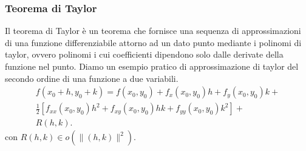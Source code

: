 \documentclass[a4paper, 12pt]{article}
\begin{document}
\subsubsection{Teorema di Taylor}
Il teorema di Taylor è un teorema che fornisce una sequenza di approssimazioni di una funzione differenziabile attorno ad un dato punto mediante i polinomi di taylor, ovvero polinomi i cui coefficienti dipendono solo dalle derivate della funzione nel punto.
Diamo un esempio pratico di approssimazione di taylor del secondo ordine di una funzione a due variabili.\\
\begin{equation*}\begin{gathered}
f(x_0+h, y_0+k) = f(x_0, y_0) + f_x(x_0, y_0)h + f_y(x_0, y_0)k + \\ \frac{1}{2}[f_{xx}(x_0, y_0)h^2 + f_{xy}(x_0, y_0)hk + f_{yy}(x_0, y_0)k^2] + \\
R(h, k).
\end{gathered}\end{equation*}
con $R(h, k) \in o(\parallel (h, k) \parallel^2)$.
\end{document}
